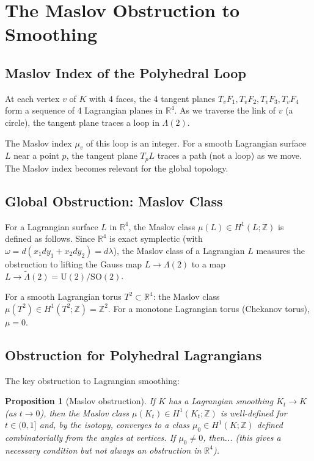 \documentclass[12pt]{article}
\newtheorem{proposition}{Proposition}
\theoremstyle{definition}
\begin{document}
\section{The Maslov Obstruction to Smoothing}

\subsection{Maslov Index of the Polyhedral Loop}

At each vertex $v$ of $K$ with 4 faces, the 4 tangent planes $T_v F_1, T_v F_2, T_v F_3, T_v F_4$ form a sequence of 4 Lagrangian planes in $\mathbb{R}^4$. As we traverse the link of $v$ (a circle), the tangent plane traces a loop in $\Lambda(2)$.

The Maslov index $\mu_v$ of this loop is an integer. For a smooth Lagrangian surface $L$ near a point $p$, the tangent plane $T_p L$ traces a path (not a loop) as we move. The Maslov index becomes relevant for the global topology.

\subsection{Global Obstruction: Maslov Class}

For a Lagrangian surface $L$ in $\mathbb{R}^4$, the Maslov class $\mu(L)\in H^1(L;\mathbb{Z})$ is defined as follows. Since $\mathbb{R}^4$ is exact symplectic (with $\omega = d(x_1 dy_1 + x_2 dy_2) = d\lambda$), the Maslov class of a Lagrangian $L$ measures the obstruction to lifting the Gauss map $L\to\Lambda(2)$ to a map $L\to\tilde\Lambda(2) = \mathrm{U}(2)/\mathrm{SO}(2)$.

For a smooth Lagrangian torus $T^2\subset\mathbb{R}^4$: the Maslov class $\mu(T^2)\in H^1(T^2;\mathbb{Z}) = \mathbb{Z}^2$. For a monotone Lagrangian torus (Chekanov torus), $\mu = 0$.

\subsection{Obstruction for Polyhedral Lagrangians}

The key obstruction to Lagrangian smoothing:

\begin{proposition}[Maslov obstruction]\label{prop:maslov}
If $K$ has a Lagrangian smoothing $K_t\to K$ (as $t\to 0$), then the Maslov class $\mu(K_t)\in H^1(K_t;\mathbb{Z})$ is well-defined for $t\in(0,1]$ and, by the isotopy, converges to a class $\mu_0\in H^1(K;\mathbb{Z})$ defined combinatorially from the angles at vertices. If $\mu_0\neq 0$, then... (this gives a necessary condition but not always an obstruction in $\mathbb{R}^4$).
\end{proposition}
\end{document}
